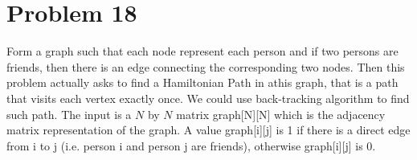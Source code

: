 \documentclass[12pt]{amsart}
\begin{document}
\begin{framed}

\end{framed}


\section{Problem 18}
Form a graph such that each node represent each person and if two persons are friends, then there is an edge connecting the corresponding two nodes. Then this problem actually asks to find a Hamiltonian Path in athis graph, that is a path that visits each vertex exactly once.
We could use back-tracking algorithm to find such path. The input is a $N$ by $N$ matrix graph[N][N] which is the adjacency matrix representation of the graph. A value graph[i][j] is 1 if there is a direct edge from i to j (i.e. person i and person j are friends), otherwise graph[i][j] is 0. 

\begin{framed}

\end{framed}






\end{document}
